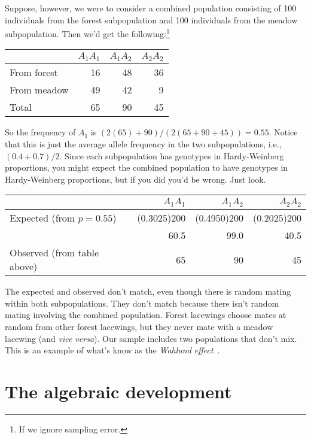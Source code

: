 Suppose, however, we were to consider a combined population consisting
of 100 individuals from the forest subpopulation and 100 individuals
from the meadow subpopulation. Then we'd get the
following:\footnote{If we ignore sampling error.}

\begin{center}
\begin{tabular}{l|rrr}
\hline\hline
       & $A_1A_1$ & $A_1A_2$ & $A_2A_2$ \\
\hline
From forest & 16  & 48       & 36 \\
From meadow & 49  & 42       & 9 \\
\hline
Total       & 65  & 90       & 45 \\
\hline
\end{tabular}
\end{center}
So the frequency of $A_1$ is $(2(65) + 90)/(2(65 + 90 + 45)) =
0.55$. Notice that this is just the average allele frequency in the
two subpopulations, i.e., $(0.4 + 0.7)/2$. Since each subpopulation has
genotypes in Hardy-Weinberg proportions, you might expect the combined
population to have genotypes in Hardy-Weinberg proportions, but if you did
you'd be wrong. Just look.

\begin{center}
\begin{tabular}{l|rrr}
\hline\hline
                            & $A_1A_1$ & $A_1A_2$ & $A_2A_2$ \\
\hline
Expected (from $p=0.55$)    & (0.3025)200 & (0.4950)200 & (0.2025)200 \\
                            & 60.5     & 99.0     & 40.5 \\
Observed (from table above) & 65       & 90       & 45 \\
\hline
\end{tabular}
\end{center}
The expected and observed don't match, even though there is random
mating within both subpopulations. They don't match because there
isn't random mating involving the combined population. Forest
lacewings choose mates at random from other forest lacewings, but they
never mate with a meadow lacewing (and {\it vice versa\/}). Our sample
includes two populations that don't mix. This is an example of what's
know as the {\it Wahlund effect}~\cite{Wahlund-1928}.

\section*{The algebraic development}

